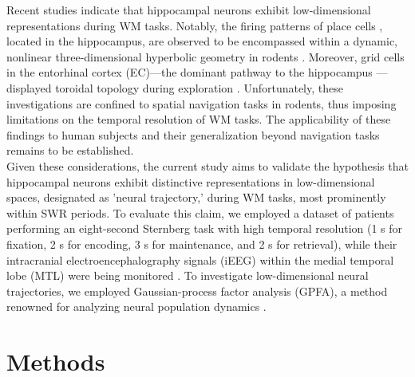 \documentclass[final,3p,times,twocolumn]{elsarticle}
\begin{document}
Recent studies indicate that hippocampal neurons exhibit low-dimensional representations during WM tasks. Notably, the firing patterns of place cells \cite{okeefe_hippocampus_1971} \cite{okeefe_place_1976} \cite{ekstrom_cellular_2003} \cite{kjelstrup_finite_2008} \cite{harvey_intracellular_2009}, located in the hippocampus, are observed to be encompassed within a dynamic, nonlinear three-dimensional hyperbolic geometry in rodents \cite{zhang_hippocampal_2022}. Moreover, grid cells in the entorhinal cortex (EC)—the dominant pathway to the hippocampus \cite{naber_reciprocal_2001} \cite{van_strien_anatomy_2009} \cite{strange_functional_2014}—displayed toroidal topology during exploration \cite{gardner_toroidal_2022}. Unfortunately, these investigations are confined to spatial navigation tasks in rodents, thus imposing limitations on the temporal resolution of WM tasks. The applicability of these findings to human subjects and their generalization beyond navigation tasks remains to be established.
\\
\indent
Given these considerations, the current study aims to validate the hypothesis that hippocampal neurons exhibit distinctive representations in low-dimensional spaces, designated as 'neural trajectory,' during WM tasks, most prominently within SWR periods. To evaluate this claim, we employed a dataset of patients performing an eight-second Sternberg task with high temporal resolution (1 s for fixation, 2 s for encoding, 3 s for maintenance, and 2 s for retrieval), while their intracranial electroencephalography signals (iEEG) within the medial temporal lobe (MTL) were being monitored \cite{boran_dataset_2020}. To investigate low-dimensional neural trajectories, we employed Gaussian-process factor analysis (GPFA), a method renowned for analyzing neural population dynamics \cite{yu_gaussian-process_2009}.
\label{sec:introduction}
\section{Methods}
\end{document}
